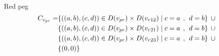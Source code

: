 \\ Red peg 
\begin{align*}
C_{v_{pr}} = &\{((a,b),(c,d))\in D(v_{pr}) \times D(v_{r12})\mid c = a \hspace{1ex} , \hspace{1ex}  d = b\} \hspace{1ex} \cup 
\\&\{((a,b),(c,d))\in D(v_{pr}) \times D(v_{r21})\mid c = a \hspace{1ex} , \hspace{1ex}  d = b\} \hspace{1ex} \cup 
\\&\{ ((a,b),(c,d))\in D(v_{pr}) \times D(v_{r23})\mid c = a \hspace{1ex} , \hspace{1ex}  d = b\}\hspace{1ex} \cup 
\\& \{(0,0)\}
\end{align*}

